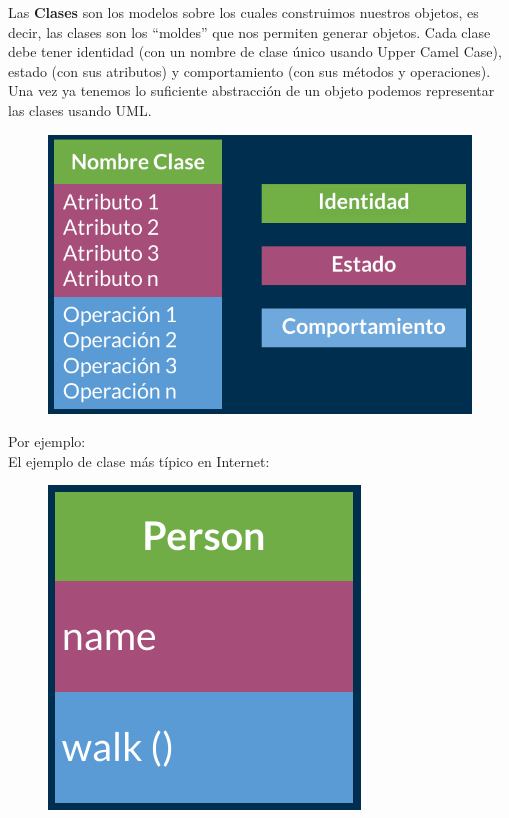 \documentclass{article}
\begin{document}
Las \textbf{Clases} son los modelos sobre los cuales construimos nuestros
objetos, es decir, las clases son los “moldes” que nos permiten generar
objetos. Cada clase debe tener identidad (con un nombre de clase único usando
Upper Camel Case), estado (con sus atributos) y comportamiento (con sus métodos
y operaciones).\\

Una vez ya tenemos lo suficiente abstracción de un objeto podemos representar
las clases usando UML.\\

\begin{figure}[h!]
  \centering
  \includegraphics[scale=0.5]{./Pictures/006_uml.png}
\end{figure}

Por ejemplo:\\

El ejemplo de clase más típico en Internet:\\

\begin{figure}[h!]
  \centering
  \includegraphics[scale=0.5]{./Pictures/007_clase_person.png}
\end{figure}
\end{document}
